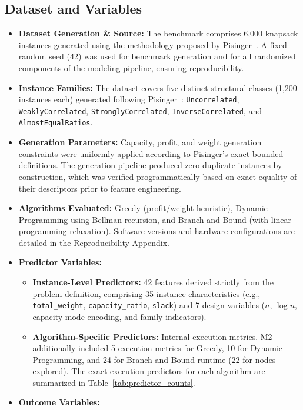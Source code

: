 \documentclass[sigconf]{acmart}
\begin{document}
\subsection{Dataset and Variables}
\begin{itemize}
  \item \textbf{Dataset Generation \& Source:} The benchmark comprises 6,000 knapsack instances generated using the methodology proposed by Pisinger~\cite{Pisinger2005}. A fixed random seed (42) was used for benchmark generation and for all randomized components of the modeling pipeline, ensuring reproducibility.
  \item \textbf{Instance Families:} The dataset covers five distinct structural classes (1,200 instances each) generated following Pisinger~\cite{Pisinger2005}: \texttt{Uncorrelated}, \texttt{WeaklyCorrelated}, \texttt{StronglyCorrelated}, \texttt{InverseCorrelated}, and \texttt{AlmostEqualRatios}.
  \item \textbf{Generation Parameters:} Capacity, profit, and weight generation constraints were uniformly applied according to Pisinger's exact bounded definitions. The generation pipeline produced zero duplicate instances by construction, which was verified programmatically based on exact equality of their descriptors prior to feature engineering.
  \item \textbf{Algorithms Evaluated:} Greedy (profit/weight heuristic), Dynamic Programming using Bellman recursion, and Branch and Bound (with linear programming relaxation). Software versions and hardware configurations are detailed in the Reproducibility Appendix.
  \item \textbf{Predictor Variables:}
\begin{itemize}
  \item \textbf{Instance-Level Predictors:} 42 features derived strictly from the problem definition, comprising 35 instance characteristics (e.g., \texttt{total\_weight}, \texttt{capacity\_ratio}, \texttt{slack}) and 7 design variables ($n$, $\log n$, capacity mode encoding, and family indicators).
  \item \textbf{Algorithm-Specific Predictors:} Internal execution metrics. M2 additionally included 5 execution metrics for Greedy, 10 for Dynamic Programming, and 24 for Branch and Bound runtime (22 for nodes explored). The exact execution predictors for each algorithm are summarized in Table~\ref{tab:predictor_counts}.
\end{itemize}
  \item \textbf{Outcome Variables:}

\end{itemize}
\end{document}
